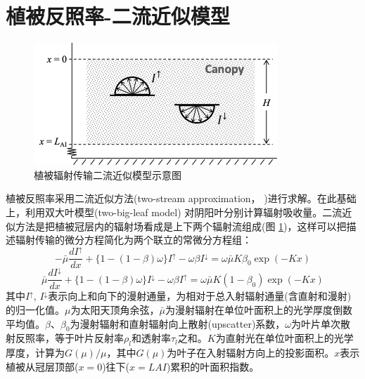 \section{植被反照率-二流近似模型}\label{植被反照率二流近似模型}
{
\begin{figure}[]
\centering
\includegraphics{Figures/辐射过程及辐射通量计算/二流近似模型示意图.png}
\caption{植被辐射传输二流近似模型示意图}
\label{fig:二流近似模型示意图}
\end{figure}
}
植被反照率采用二流近似方法(two-stream approximation， \citet{dickinson1983land,sellers1985canopy} )进行求解。在此基础上，利用双大叶模型(two-big-leaf model) \citep{dai2004two} 对阴阳叶分别计算辐射吸收量。二流近似方法是把植被冠层内的辐射场看成是上下两个辐射流组成(图 \ref{fig:二流近似模型示意图})，这样可以把描述辐射传输的微分方程简化为两个联立的常微分方程组：
\begin{equation}\label{di_dx1}
-\bar{\mu} \frac{d I^{\uparrow}}{d x}+\{1-(1-\beta) \omega\} I^{\uparrow}-\omega \beta I^{\downarrow}=\omega \bar{\mu} K \beta_{0} \exp (-K x)
\end{equation}
\begin{equation}\label{di_dx2}
\bar{\mu} \frac{d I^{\downarrow}}{d x}+\{1-(1-\beta) \omega\} I^{\downarrow}-\omega \beta I^{\uparrow}=\omega \bar{\mu} K\left(1-\beta_{0}\right) \exp (-K x)
\end{equation}
其中$I^{\uparrow}$, $I^{\downarrow}$表示向上和向下的漫射通量，为相对于总入射辐射通量(含直射和漫射)的归一化值。$\mu$为太阳天顶角余弦，$\bar{\mu}$为漫射辐射在单位叶面积上的光学厚度倒数平均值。$\beta$、$\beta_{0}$为漫射辐射和直射辐射向上散射(upscatter)系数，$\omega$为叶片单次散射反照率，等于叶片反射率$\rho_{l}$和透射率$\tau_{l}$之和。$K$为直射光在单位叶面积上的光学厚度，计算为$G(\mu) / \mu$，其中$G(\mu)$为叶子在入射辐射方向上的投影面积。$x$表示植被从冠层顶部($x=0$)往下($x=LAI$)累积的叶面积指数。

